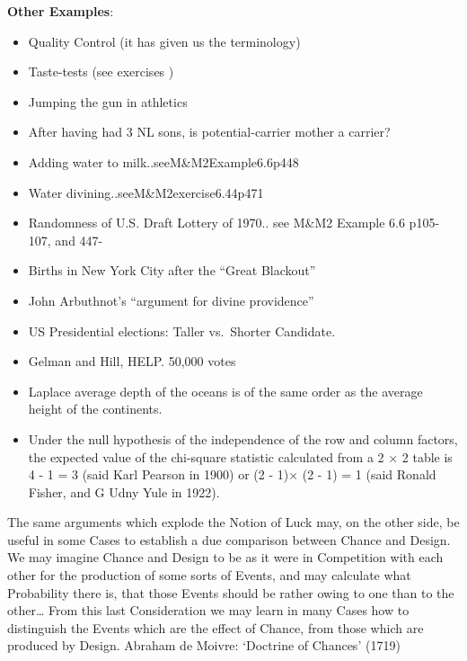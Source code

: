 \documentclass[]{book}
\providecommand{\tightlist}{%
  \setlength{\itemsep}{0pt}\setlength{\parskip}{0pt}}
\begin{document}
\textbf{Other Examples}:

\begin{itemize}
\tightlist
\item
  Quality Control (it has given us the terminology)
\item
  Taste-tests (see exercises )
\item
  Jumping the gun in athletics
\item
  After having had 3 NL sons, is potential-carrier mother a carrier?
\item
  Adding water to milk..seeM\&M2Example6.6p448
\item
  Water divining..seeM\&M2exercise6.44p471
\item
  Randomness of U.S. Draft Lottery of 1970.. see M\&M2
  Example 6.6 p105-107, and 447-
\item
  Births in New York City after the ``Great Blackout''
\item
  John Arbuthnot's ``argument for divine providence''
\item
  US Presidential elections: Taller vs.~Shorter Candidate.
\item
  Gelman and Hill, HELP. 50,000 votes
\item
  Laplace average depth of the oceans is of the same order as the average height of the continents.
\item
  Under the null hypothesis of the independence of the row and column factors, the expected value of the chi-square statistic calculated from a 2 \(\times\) 2 table is 4 - 1 = 3 (said Karl Pearson in 1900) or (2 - 1)\(\times\) (2 - 1) = 1 (said Ronald Fisher, and G Udny Yule in 1922).
\end{itemize}

The same arguments which explode the Notion of Luck may, on the other side, be useful in some Cases to establish a due comparison between Chance and Design. We may imagine Chance and Design to be as it were in Competition with each other for the production of some sorts of Events, and may calculate what Probability there is, that those Events should be rather owing to one than to the other\ldots{} From this last Consideration we may learn in many Cases how to distinguish the Events which are the effect of Chance, from those which are produced by Design.
Abraham de Moivre: `Doctrine of Chances' (1719)
\end{document}
